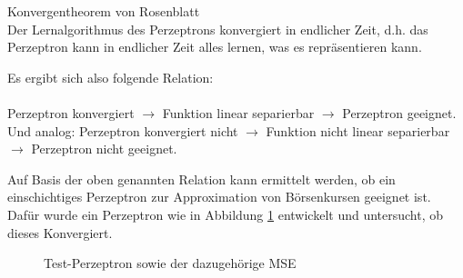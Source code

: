 \begin{theo}Konvergentheorem von Rosenblatt\\
Der Lernalgorithmus des Perzeptrons konvergiert in endlicher Zeit, d.h. das Perzeptron kann in endlicher Zeit alles lernen, was es repräsentieren kann.
\end{theo}

Es ergibt sich also folgende Relation:\\\\
Perzeptron konvergiert $\rightarrow$ Funktion linear separierbar $\rightarrow$ Perzeptron geeignet.
Und analog: Perzeptron konvergiert nicht $\rightarrow$ Funktion nicht linear separierbar $\rightarrow$ Perzeptron nicht geeignet.

Auf Basis der oben genannten Relation kann ermittelt werden, ob ein einschichtiges Perzeptron zur Approximation von Börsenkursen geeignet ist. Dafür wurde ein Perzeptron wie in Abbildung \ref{Testperz} entwickelt und untersucht, ob dieses Konvergiert.

\begin{figure}[H]
\hfill
{}
\hfill
{}
\hfill
\caption{Test-Perzeptron sowie der dazugehörige MSE}
\label{Testperz}
\end{figure}

